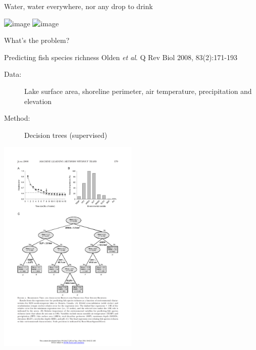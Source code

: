 \documentclass[pdf]{beamer}
\begin{document}


\begin{frame}{Water, water everywhere, nor any drop to drink}
\begin{center}	
	\includegraphics<1>[width=0.8\textwidth]{bigDataCartoon.jpg}
	\includegraphics<2>[width=0.8\textwidth]{pulpFiction.jpg}
\end{center}
\end{frame}

\begin{frame}{What's the problem?}
\begin{exampleblock}{Predicting fish species richness \vskip-1mm{\tiny Olden \textit{et al}. Q Rev Biol 2008, 83(2):171-193}}
\begin{description}
	\item[Data:] Lake surface area, shoreline perimeter, air temperature, precipitation and elevation
	\item[Method:] Decision trees (supervised)
\end{description}
\begin{center}
	\includegraphics[width=0.5\textwidth]{olden.pdf}
\end{center}
\end{exampleblock}
\end{frame}
\end{document}
